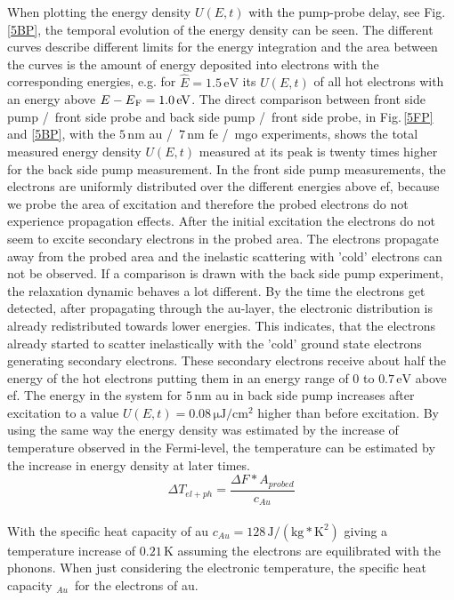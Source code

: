 \documentclass[a4paper,12pt,twoside]{article}
\begin{document}
When plotting the energy density $U(E,t)$ with the pump-probe delay, see Fig.\,\ref{5BP}, the temporal evolution of the energy density can be seen. The different curves describe different limits for the energy integration and the area between the curves is the amount of energy deposited into electrons with the corresponding energies, e.g. for $\hat{E} = 1.5\,\mathrm{eV}$ its $U(E,t)$ of all hot electrons with an energy above $E-E{\mathrm{\textsubscript F}} = 1.0\,\mathrm{eV}$. The direct comparison between front side pump /\, front side probe and back side pump /\, front side probe, in Fig.\,\ref{5FP} and \ref{5BP}, with the $5\,\mathrm{nm}$ \gls{au} /\, $7\,\mathrm{nm}$ \gls{fe} /\, \gls{mgo} experiments, shows the total measured energy density $U(E,t)$ measured at its peak is twenty times higher for the back side pump measurement. In the front side pump measurements, the electrons are uniformly distributed over the different energies above \gls{ef}, because we probe the area of excitation and therefore the probed electrons do not experience propagation effects. After the initial excitation the electrons do not seem to excite secondary electrons in the probed area. The electrons propagate away from the probed area and the inelastic scattering with 'cold' electrons can not be observed. If a comparison is drawn with the back side pump experiment, the relaxation dynamic behaves a lot different. By the time the electrons get detected, after propagating through the \gls{au}-layer, the electronic distribution is already redistributed towards lower energies. This indicates, that the electrons already started to scatter inelastically with the 'cold' ground state electrons generating secondary electrons. These secondary electrons receive about half the energy of the hot electrons putting them in an energy range of 0 to $0.7\,\mathrm{eV}$ above \gls{ef}. The energy in the system for $5\,\mathrm{nm}$ \gls{au} in back side pump increases after excitation to a value $U(E,t) = 0.08\,\mathrm{\mu J/cm^2}$ higher than before excitation. By using the same way the energy density was estimated by the increase of temperature observed in the Fermi-level, the temperature can be estimated by the increase in energy density at later times.
\begin{equation}
    \label{eqtempph}
\Delta T_{el+ph} = \frac{ \Delta F * A_{probed} }{ c_{Au} }
\end{equation}
\\
\noindent With the specific heat capacity of \gls{au} $c_{Au} = 128\,\mathrm{J/(kg*K^2)}$ giving a temperature increase of $0.21\,\mathrm{K}$ assuming the electrons are equilibrated with the phonons. When just considering the electronic temperature, the specific heat capacity \textgamma$_{Au}$\, for the electrons of \gls{au}.
\end{document}
